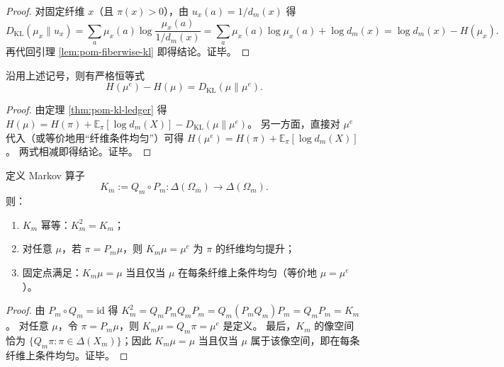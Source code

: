 \begin{proof}
对固定纤维 \(x\)（且 \(\pi(x)>0\)），由 \(u_x(a)=1/d_m(x)\) 得
\[
D_{\mathrm{KL}}(\mu_x\|u_x)
=\sum_{a}\mu_x(a)\log\frac{\mu_x(a)}{1/d_m(x)}
=\sum_a \mu_x(a)\log\mu_x(a)+\log d_m(x)
=\log d_m(x)-H(\mu_x).
\]
再代回引理 \ref{lem:pom-fiberwise-kl} 即得结论。证毕。
\end{proof}

\begin{corollary}\label{cor:pom-ent-increase-equals-kl}
沿用上述记号，则有严格恒等式
\[
\boxed{\;
H(\mu^e)-H(\mu)=D_{\mathrm{KL}}(\mu\|\mu^e).
\;}
\]
\end{corollary}
\begin{proof}
由定理 \ref{thm:pom-kl-ledger} 得
\(
H(\mu)=H(\pi)+\mathbb{E}_{\pi}[\log d_m(X)]-D_{\mathrm{KL}}(\mu\|\mu^e)
\)。
另一方面，直接对 $\mu^e$ 代入（或等价地用“纤维条件均匀”）可得
\(
H(\mu^e)=H(\pi)+\mathbb{E}_{\pi}[\log d_m(X)]
\)。
两式相减即得结论。证毕。
\end{proof}

\begin{theorem}\label{thm:pom-fiber-reflector}
定义 Markov 算子
\[
K_m:=Q_m\circ P_m:\Delta(\Omega_m)\to\Delta(\Omega_m).
\]
则：
\begin{enumerate}
  \item $K_m$ 幂等：$K_m^2=K_m$；
  \item 对任意 $\mu$，若 $\pi=P_m\mu$，则 $K_m\mu=\mu^e$ 为 $\pi$ 的纤维均匀提升；
  \item 固定点满足：$K_m\mu=\mu$ 当且仅当 $\mu$ 在每条纤维上条件均匀（等价地 $\mu=\mu^e$）。
\end{enumerate}
\end{theorem}
\begin{proof}
由 $P_m\circ Q_m=\mathrm{id}$ 得
\(
K_m^2=Q_mP_mQ_mP_m=Q_m(P_mQ_m)P_m=Q_mP_m=K_m
\)。
对任意 $\mu$，令 $\pi=P_m\mu$，则 $K_m\mu=Q_m\pi=\mu^e$ 是定义。
最后，$K_m$ 的像空间恰为 $\{Q_m\pi:\pi\in\Delta(X_m)\}$；因此 $K_m\mu=\mu$ 当且仅当 $\mu$ 属于该像空间，即在每条纤维上条件均匀。证毕。
\end{proof}

